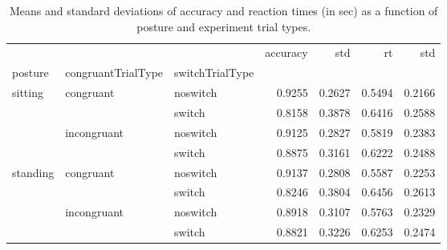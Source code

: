 \begin{table}
\centering
\caption{Means and standard deviations of accuracy and reaction times (in sec) as a function of posture and experiment trial types.}
\label{table-task-switching-replication-reaction-time}
\begin{tabular}{lllrrrr}
\toprule
         &             &        & accuracy &    std &     rt &    std \\
posture & congruantTrialType & switchTrialType &          &        &        &        \\
\midrule
sitting & congruant & noswitch &   0.9255 & 0.2627 & 0.5494 & 0.2166 \\
         &             & switch &   0.8158 & 0.3878 & 0.6416 & 0.2588 \\
         & incongruant & noswitch &   0.9125 & 0.2827 & 0.5819 & 0.2383 \\
         &             & switch &   0.8875 & 0.3161 & 0.6222 & 0.2488 \\
standing & congruant & noswitch &   0.9137 & 0.2808 & 0.5587 & 0.2253 \\
         &             & switch &   0.8246 & 0.3804 & 0.6456 & 0.2613 \\
         & incongruant & noswitch &   0.8918 & 0.3107 & 0.5763 & 0.2329 \\
         &             & switch &   0.8821 & 0.3226 & 0.6253 & 0.2474 \\
\bottomrule
\end{tabular}
\end{table}
